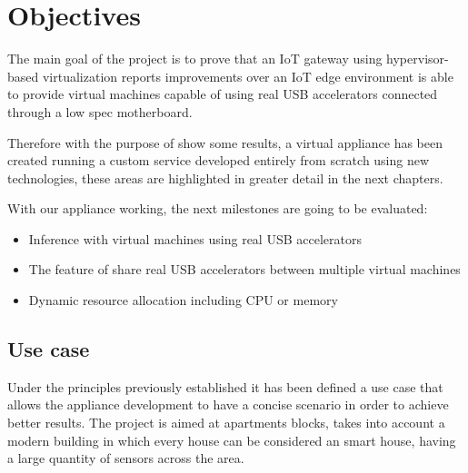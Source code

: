 \newpage
\section{Objectives}
\label{makereference1.2}

The main goal of the project is to prove that an IoT gateway using hypervisor-based virtualization reports improvements over an IoT edge environment is able to provide virtual machines capable of using real USB accelerators connected through a low spec motherboard.

Therefore with the purpose of show some results, a virtual appliance has been created running a custom service developed entirely from scratch using new technologies, these areas are highlighted in greater detail in the next chapters. 

With our appliance working, the next milestones are going to be evaluated:

\begin{itemize}
  \item Inference with virtual machines using real USB accelerators
  \item The feature of share real USB accelerators between multiple virtual machines
  \item Dynamic resource allocation including CPU or memory 
\end{itemize}

\subsection{Use case}
\label{makereference1.2.1}
Under the principles previously established it has been defined a use case that allows the appliance development to have a concise scenario in order to achieve better results. The project is aimed at apartments blocks, takes into account a modern building in which every house can be considered an smart house, having a large quantity of sensors across the area.

